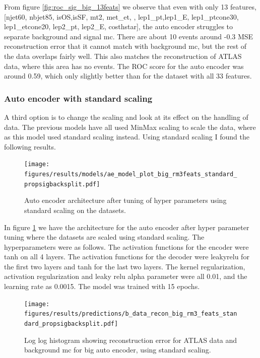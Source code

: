 \documentclass[ reprint, amsmath,amssymb, aps, nofootinbib]{revtex4-2}
\begin{document}
From figure \ref{fig:roc_sig_big_13feats} we observe that even with only 13 features, 
[njet60,  nbjet85, isOS,isSF,  mt2, met\_et,  , lep1\_pt,lep1\_E, lep1\_ptcone30, lep1\_etcone20, lep2\_pt,  lep2\_E, costhstar], the auto encoder struggles to separate background and signal mc. There are about 10 events around -0.3 MSE reconstruction error that it cannot match with background mc, but the rest of the data overlaps fairly well. This also matches the reconstruction of ATLAS data, where this area has no events. The ROC score for the auto encoder was around 0.59, which only slightly better than for the dataset with all 33 features. \par

\subsubsection{Auto encoder with standard scaling}

A third option is to change the scaling and look at its effect on the handling of data. The previous models have all used MinMax scaling to scale the data, where as this model used standard scaling instead. Using standard scaling I found the following results.

\begin{figure}[H]
     \centering
         \texttt{[image: figures/results/models/ae\_model\_plot\_big\_rm3feats\_standard\_propsigbacksplit.pdf]}
         \caption{Auto encoder architecture after tuning of hyper parameters using standard scaling on the datasets. }
     \label{fig:ae_big_standard}
\end{figure}

In figure \ref{fig:ae_big_standard} we have the architecture for the auto encoder after hyper parameter tuning where the datasets are scaled using standard scaling. The hyperparameters were as follows. The activation functions for the encoder were tanh on all 4 layers. The activation functions for the decoder were leakyrelu for the first two layers and tanh for the last two layers. The kernel regularization, activation regularization and leaky relu alpha parameter were all 0.01, and the learning rate as 0.0015. The model was trained with 15 epochs.

\begin{figure}[H]
     \centering
         \texttt{[image: figures/results/predictions/b\_data\_recon\_big\_rm3\_feats\_standard\_propsigbacksplit.pdf]}
         \caption{Log log histogram showing reconstruction error for ATLAS data and background mc for big auto encoder, using standard scaling.}
     \label{fig:data_b_big_pred_stand}
\end{figure}
\end{document}
